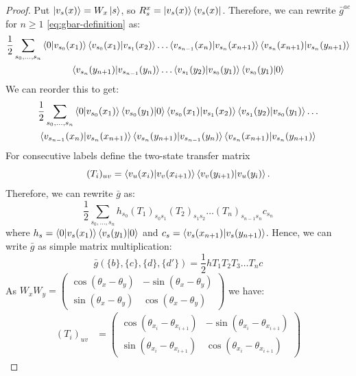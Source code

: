 \documentclass[aps,floatfix,10pt,amssymb,amsfont,amsmath,superscriptaddress,float,nofootinbib,longbibliography,nobalancelastpage,twocolumn]{revtex4-2}
\begin{document}
\begin{proof}
Put $\ket{v_s(x)}=W_x\ket{s}$, so
$R_s^x=\ket{v_s(x)}\bra{v_s(x)}$. Therefore, we can rewrite $\bar g^{ae}$ for $n\geq 1$ \eqref{eq:gbar-definition} as:
\begin{multline}
    \frac{1}{2}\sum_{s_0,\ldots,s_n} \braket{0|v_{s_0}(x_1)}\braket{v_{s_0}(x_1)|v_{s_1}(x_2)}\ldots \braket{v_{s_{n-1}}(x_n)|v_{s_n}(x_{n+1})}\braket{v_{s_n}(x_{n+1})|v_{s_n}(y_{n+1})}\\\braket{v_{s_n}(y_{n+1})|v_{s_{n-1}}(y_n)}\ldots\braket{v_{s_1}(y_2)|v_{s_0}(y_1)}\braket{v_{s_0}(y_1)|0}
\end{multline}
We can reorder this to get:
\begin{multline}
    \frac{1}{2}\sum_{s_0,\ldots,s_n} \braket{0|v_{s_0}(x_1)}\braket{v_{s_0}(y_1)|0}\braket{v_{s_0}(x_1)|v_{s_1}(x_2)}\braket{v_{s_1}(y_2)|v_{s_0}(y_1)}\ldots\\ \braket{v_{s_{n-1}}(x_{n})|v_{s_{n}}(x_{n+1})}\braket{v_{s_{n}}(y_{n+1})|v_{s_{n-1}}(y_{n})}\braket{v_{s_{n}}(x_{n+1})|v_{s_{n}}(y_{n+1})}
\end{multline}
For consecutive labels define
the two-state transfer matrix
\begin{equation*}
    (T_i)_{uv}=\braket{v_u(x_i)|v_v(x_{i+1})}
    \braket{v_v(y_{i+1})|v_u(y_i)}.
\end{equation*}
Therefore, we can rewrite $\bar g$ as:
\begin{equation}
   \frac{1}{2}\sum_{s_0,\ldots,s_n} h_{s_0}(T_1)_{s_0s_1}(T_2)_{s_1s_2}\ldots (T_n)_{s_{n-1}s_{n}} c_{s_n}
\end{equation}
where $h_s = \braket{0|v_{s}(x_1)}\braket{v_{s}(y_1)|0}$ and $c_s =\braket{v_{s}(x_{n+1})|v_{s}(y_{n+1})}$. Hence, we can write $\bar g$ as simple matrix multiplication:
\begin{equation}
    \bar g(\{b\},\{c\},\{d\},\{d'\}) = \frac{1}{2}hT_1T_2T_3\ldots T_nc
\end{equation}
As $W_xW_y = \begin{pmatrix}
    \cos (\theta_x - \theta_y) & - \sin (\theta_x - \theta_y)\\
     \sin (\theta_x - \theta_y) & \cos (\theta_x - \theta_y)
\end{pmatrix}$ we have:
\begin{align}
    (T_i)_{u v} &=  \begin{pmatrix}
    \cos (\theta_{x_i} - \theta_{x_{i+1}}) & - \sin (\theta_{x_i} - \theta_{x_{i+1}})\\
     \sin (\theta_{x_i} - \theta_{x_{i+1}}) & \cos (\theta_{x_i} - \theta_{x_{i+1}})

\end{pmatrix}
\end{align}
\end{proof}
\end{document}
